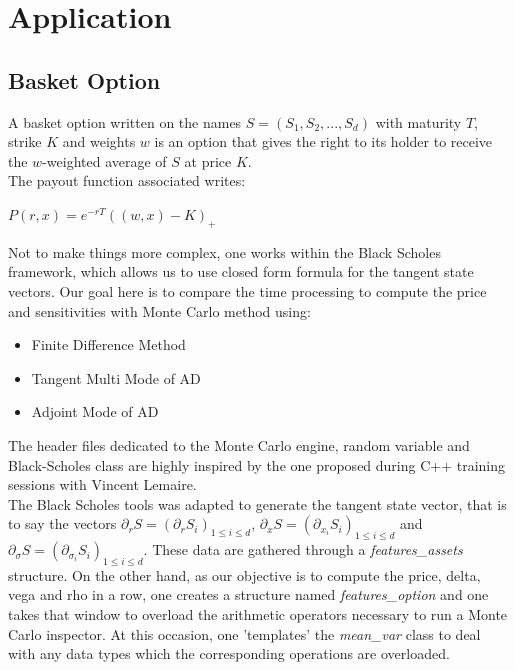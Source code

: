 \documentclass {article}
\begin{document}
	\section{Application}
	
		\subsection{Basket Option}
		
			A basket option written on the names $S = (S_{1}, S_{2}, ..., S_{d})$ with maturity $T$, strike $K$ and weights $w$ is 
			an option that gives the right to its holder to receive the $w$-weighted average of $S$ at price $K$. \\
			The payout function associated writes:
			
			\begin{center}
				$P (r, x) = e^{-rT} ((w, x) - K)_{+}$
			\end{center}
			
			Not to make things more complex, one works within the Black Scholes framework, which allows us to use closed form formula for the tangent state vectors.
			Our goal here is to compare the time processing to compute the price and sensitivities with Monte Carlo method using:
			
			\begin{itemize}
				\item
					Finite Difference Method
				\item
					Tangent Multi Mode of AD
				\item
					Adjoint Mode of AD
			\end{itemize}
			
			The header files dedicated to the Monte Carlo engine, random variable and Black-Scholes class are highly inspired by the one proposed during C++ training sessions with Vincent Lemaire. \\
			The Black Scholes tools was adapted to generate the tangent state vector, that is to say the vectors $\partial_{r} S = (\partial_{r} S_{i})_{1 \leq i \leq d}$, $\partial_{x} S = \left( \partial_{x_{i}} S_{i} \right)_{1 \leq i \leq d}$ and $\partial_{\sigma} S = \left( \partial_{\sigma_{i}} S_{i} \right)_{1 \leq i \leq d}$. These data are gathered through a \textit{features\_assets} structure.
			On the other hand, as our objective is to compute the price, delta, vega and rho in a row, one creates a structure named \textit{features\_option} and one takes that window to overload the arithmetic operators necessary to run a Monte Carlo inspector. At this occasion, one 'templates' the \textit{mean\_var} class to deal with any data types which the corresponding operations are overloaded.\\
			
\end{document}
